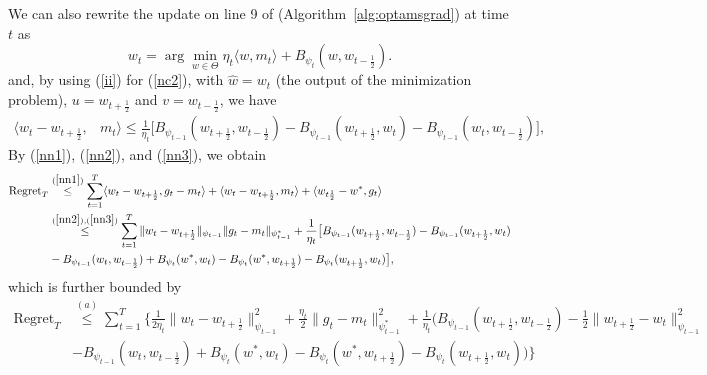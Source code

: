 \documentclass[11pt]{article}
\makeatletter
\renewenvironment{proof}[1][\proofname]{%
   \par\pushQED{\qed}\normalfont%
   \topsep6\p@\@plus6\p@\relax
   \trivlist\item[\hskip\labelsep\bfseries#1]%
   \ignorespaces
}{%
   \popQED\endtrivlist\@endpefalse
}
\theoremstyle{k}
\makeatother
\begin{document}
\begin{proof}
We can also rewrite the update on line 9 of (Algorithm~\ref{alg:optamsgrad}) at time $t$ as
\begin{equation} \label{nc2}
\textstyle w_{t} = \arg\min_{w \in \Theta} \eta_{t} \langle w, m_{t} \rangle + B_{\psi_t}(w, w_{t-\frac{1}{2}} ).
\end{equation}
and, by using (\ref{ii}) for (\ref{nc2}), with $\hat{w} = w_{t}$ (the output of the minimization problem), $u = w_{t + \frac{1}{2}}$ and $v = w_{t- \frac{1}{2}}$, we have
\begin{equation} \label{nn3}
\begin{aligned}
\langle w_t - w_{t+\frac{1}{2}}, & m_t  \rangle
\leq \frac{1}{\eta_t}\big[ B_{\psi_{t-1}}( w_{t+\frac{1}{2}}, w_{t-\frac{1}{2}}) - B_{\psi_{t-1}}(w_{t+\frac{1}{2}}, w_t ) - B_{\psi_{t-1}}(w_{t}, w_{t-\frac{1}{2}}) \big],
\end{aligned}
\end{equation}
By (\ref{nn1}), (\ref{nn2}), and (\ref{nn3}), we obtain
\begin{equation} \label{nnn}
\begin{aligned}
 \text{Regret}_T & \overset{(\ref{nn1})}{\leq} \sum_{t=1}^T \langle  w_t - w_{t+\frac{1}{2}} , g_t - m_t \rangle + \langle w_t - w_{t+\frac{1}{2}}, m_t \rangle + \langle w_{t \frac{1}{2}} - w^*, g_t  \rangle \\
& \overset{(\ref{nn2}), (\ref{nn3})}{\leq}  \sum_{t=1}^T \| w_t - w_{t+\frac{1}{2} } \|_{\psi_{t-1}} \| g_t - m_t  \|_{\psi_{t-1}^*}
+ \frac{1}{\eta_t} \big[ B_{\psi_{t-1}}( w_{t+\frac{1}{2}}, w_{t-\frac{1}{2}}) - B_{\psi_{t-1}}(w_{t+\frac{1}{2}}, w_t ) \\
& - B_{\psi_{t-1}}(w_{t}, w_{t-\frac{1}{2}}) + B_{\psi_t}( w^*, w_{t}) -B_{\psi_t}(w^*,  w_{t+\frac{1}{2}} ) - B_{\psi_t}(w_{t+\frac{1}{2}}, w_{t}) \big],
\end{aligned}
\end{equation}
which is further bounded by
\begin{equation} \label{nnnn}
\begin{aligned}
 \text{Regret}_T &  \overset{(a)}{\leq} \sum_{t=1}^T \Big\{ \frac{1}{2 \eta_t} \| w_t - w_{t+\frac{1}{2} } \|_{\psi_{t-1}}^2 + \frac{\eta_t}{2} \| g_t - m_t  \|_{\psi_{t-1}^*}^2 + \frac{1}{\eta_t} \big( B_{\psi_{t-1}}( w_{t+\frac{1}{2}}, w_{t-\frac{1}{2}}) - \frac{1}{2} \| w_{t+\frac{1}{2}} - w_t \|_{\psi_{t-1}}^2\\
& - B_{\psi_{t-1}}(w_{t}, w_{t-\frac{1}{2}}) +  B_{\psi_t}( w^*, w_{t}) - B_{\psi_t}(w^*,  w_{t+\frac{1}{2}} ) - B_{\psi_t}(w_{t+\frac{1}{2}}, w_{t})  \big) \Big\}\\

\end{aligned}
\end{equation}
\end{proof}
\end{document}
